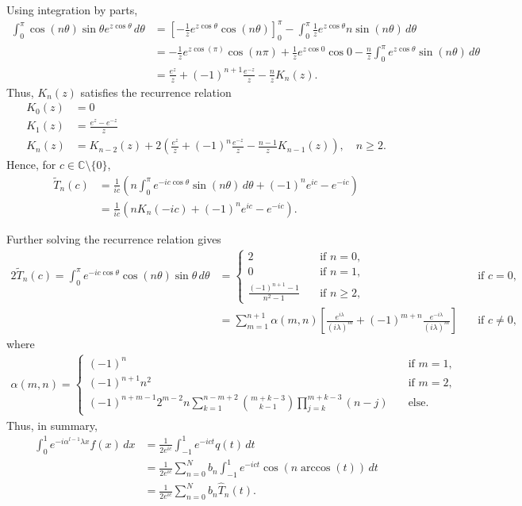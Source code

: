\documentclass[12pt, oneside, a4paper]{article}
\begin{document}
Using integration by parts,
\begin{align*}
\int_0^{\pi}\cos(n\theta)\sin\theta e^{z\cos\theta}\,d\theta &= \left[-\frac{1}{z}e^{z\cos\theta}\cos(n\theta)\right]_0^{\pi} - \int_0^{\pi}\frac{1}{z}e^{z\cos\theta}n\sin(n\theta)\,d\theta\\
&= -\frac{1}{z}e^{z\cos(\pi)}\cos(n\pi) + \frac{1}{z}e^{z\cos 0}\cos 0 - \frac{n}{z}\int_0^{\pi}e^{z\cos\theta}\sin(n\theta)\,d\theta\\
&= \frac{e^z}{z} + (-1)^{n+1}\frac{e^{-z}}{z} - \frac{n}{z}K_n(z).
\end{align*}
Thus, $K_n(z)$ satisfies the recurrence relation
\begin{align*}
K_0(z) &= 0\\
K_1(z) &= \frac{e^z-e^{-z}}{z}\\
K_{n}(z) &= K_{n-2}(z) + 2\left(\frac{e^z}{z} + (-1)^{n}\frac{e^{-z}}{z} - \frac{n-1}{z}K_{n-1}(z)\right),\quad n\geq 2.
\end{align*}
Hence, for $c\in\mathbb{C}\setminus\{0\}$,
\begin{align*}
\tilde{T}_n(c) &= \frac{1}{ic}\left(n\int_0^{\pi}e^{-ic\cos\theta}\sin(n\theta)\,d\theta + (-1)^n e^{ic}- e^{-ic}\right)\\
&= \frac{1}{ic}\left(nK_n(-ic) + (-1)^n e^{ic} - e^{-ic}\right).
\end{align*}

Further solving the recurrence relation \cite{Fokas2012} gives
\begin{alignat*}{2}
    \tilde{T}_n(c) = \int_0^\pi e^{-ic\cos\theta}\cos(n\theta)\sin\theta\,d\theta &= 
    \begin{cases}
        2 &\quad\mbox{if $n=0$},\\
        0 &\quad\mbox{if $n=1$},\\
        \frac{(-1)^{n+1}-1}{n^2-1} &\quad\mbox{if $n\geq 2$},
    \end{cases}
    &\quad\mbox{if $c=0$},\\
    &= \sum_{m=1}^{n+1}\alpha(m,n)\left[\frac{e^{i\lambda}}{(i\lambda)^m} + (-1)^{m+n}\frac{e^{-i\lambda}}{(i\lambda)^m}\right]&\quad\mbox{if $c\neq 0$},
\end{alignat*}
where
\begin{align*}
\alpha(m,n) =
\begin{cases}
(-1)^n&\quad\mbox{if $m=1$},\\
(-1)^{n+1}n^2&\quad\mbox{if $m=2$},\\
(-1)^{n+m-1}2^{m-2}n\sum_{k=1}^{n-m+2}\binom{m+k-3}{k-1}\prod_{j=k}^{m+k-3}(n-j)&\quad\mbox{else}.
\end{cases}
\end{align*}
Thus, in summary,
\begin{align*}
    \int_0^1 e^{-i\alpha^{l-1}\lambda x}f(x)\,dx &= \frac{1}{2e^{ic}}\int_{-1}^1 e^{-ict} q(t)\,dt\\
    &= \frac{1}{2e^{ic}}\sum_{n=0}^N b_n \int_{-1}^1 e^{-ict}\cos(n \arccos(t))\,dt\\
    &= \frac{1}{2e^{ic}}\sum_{n=0}^N b_n \hat{T}_n(t).
\end{align*}
\end{document}
